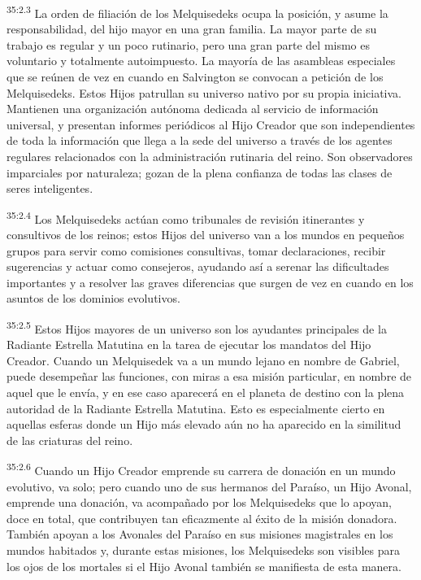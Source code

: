 \par
\textsuperscript{35:2.3} La orden de filiación de los Melquisedeks ocupa la posición, y asume la responsabilidad, del hijo mayor en una gran familia. La mayor parte de su trabajo es regular y un poco rutinario, pero una gran parte del mismo es voluntario y totalmente autoimpuesto. La mayoría de las asambleas especiales que se reúnen de vez en cuando en Salvington se convocan a petición de los Melquisedeks. Estos Hijos patrullan su universo nativo por su propia iniciativa. Mantienen una organización autónoma dedicada al servicio de información universal, y presentan informes periódicos al Hijo Creador que son independientes de toda la información que llega a la sede del universo a través de los agentes regulares relacionados con la administración rutinaria del reino. Son observadores imparciales por naturaleza; gozan de la plena confianza de todas las clases de seres inteligentes.

\par
\textsuperscript{35:2.4} Los Melquisedeks actúan como tribunales de revisión itinerantes y consultivos de los reinos; estos Hijos del universo van a los mundos en pequeños grupos para servir como comisiones consultivas, tomar declaraciones, recibir sugerencias y actuar como consejeros, ayudando así a serenar las dificultades importantes y a resolver las graves diferencias que surgen de vez en cuando en los asuntos de los dominios evolutivos.

\par
\textsuperscript{35:2.5} Estos Hijos mayores de un universo son los ayudantes principales de la Radiante Estrella Matutina en la tarea de ejecutar los mandatos del Hijo Creador. Cuando un Melquisedek va a un mundo lejano en nombre de Gabriel, puede desempeñar las funciones, con miras a esa misión particular, en nombre de aquel que le envía, y en ese caso aparecerá en el planeta de destino con la plena autoridad de la Radiante Estrella Matutina. Esto es especialmente cierto en aquellas esferas donde un Hijo más elevado aún no ha aparecido en la similitud de las criaturas del reino.

\par
\textsuperscript{35:2.6} Cuando un Hijo Creador emprende su carrera de donación en un mundo evolutivo, va solo; pero cuando uno de sus hermanos del Paraíso, un Hijo Avonal, emprende una donación, va acompañado por los Melquisedeks que lo apoyan, doce en total, que contribuyen tan eficazmente al éxito de la misión donadora. También apoyan a los Avonales del Paraíso en sus misiones magistrales en los mundos habitados y, durante estas misiones, los Melquisedeks son visibles para los ojos de los mortales si el Hijo Avonal también se manifiesta de esta manera.

